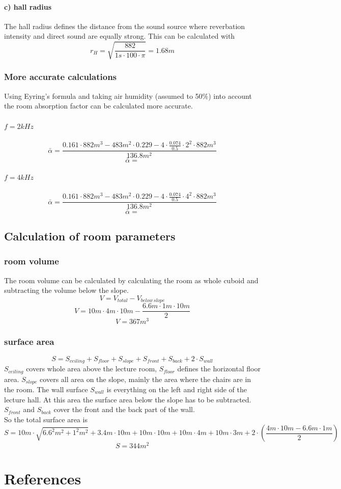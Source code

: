 \documentclass{article}
\begin{document}
\paragraph{c) hall radius\\}
The hall radius defines the distance from the sound source where reverbation intensity and direct sound are equally strong. This can be calculated with
$$r_H=\sqrt{\frac{882}{1s\cdot 100\cdot \pi}}=1.68m$$
\subsubsection{More accurate calculations}
Using Eyring's formula and taking air humidity (assumed to 50\%) into account the room absorption factor can be calculated more accurate.
\paragraph{$f=2kHz$}
$$\bar{\alpha}=\frac{0.161\cdot 882m^3-483m^2\cdot 0.229-4\cdot \frac{0.074}{0.5}\cdot 2^2\cdot 882m^3}{136.8m^2}$$
$$\bar{\alpha}=$$
\paragraph{$f=4kHz$}
$$\bar{\alpha}=\frac{0.161\cdot 882m^3-483m^2\cdot 0.229-4\cdot \frac{0.074}{0.5}\cdot 4^2\cdot 882m^3}{136.8m^2}$$
$$\bar{\alpha}=$$
\subsection{Calculation of room parameters\label{sec:roomparam}}
\subsubsection{room volume}
The room volume can be calculated by calculating the room as whole cuboid and subtracting the volume below the slope.
\begin{equation}
V=V_{total}-V_{below\,slope}
\end{equation}
$$V=10m\cdot 4m\cdot 10m-\frac{6.6m\cdot 1m\cdot 10m}{2}$$
$$V=367m^3$$
\subsubsection{surface area}
\begin{equation}
S=S_{ceiling}+S_{floor}+S_{slope}+S_{front}+S_{back}+2\cdot S_{wall}
\end{equation}
$S_{ceiling}$ covers whole area above the lecture room, $S_{floor}$ defines the horizontal floor area. $S_{slope}$ covers all area on the slope, mainly the area where the chairs are in the room. The wall surface $S_{wall}$ is everything on the left and right side of the lecture hall. At this area the surface area below the slope has to be subtracted. $S_{front}$ and $S_{back}$ cover the front and the back part of the wall.\\
So the total surface area is
$$S=10m\cdot\sqrt{6.6^2m^2+1^2m^2}+3.4m\cdot 10m+10m\cdot 10m+10m\cdot 4m+10m\cdot 3m+2\cdot(\frac{4m\cdot 10m-6.6m\cdot 1m}{2})$$
$$S=344m^2$$
\newpage
\section{References}
\end{document}
